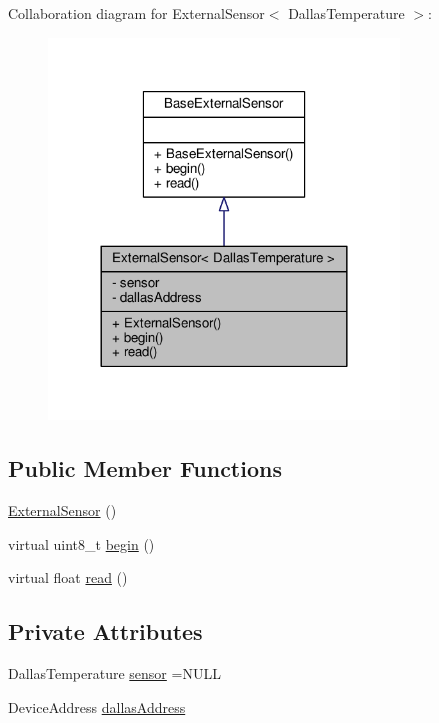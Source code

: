 Collaboration diagram for External\+Sensor$<$ Dallas\+Temperature $>$\+:\nopagebreak
\begin{figure}[H]
\begin{center}
\leavevmode
\includegraphics[width=264pt]{classExternalSensor_3_01DallasTemperature_01_4__coll__graph}
\end{center}
\end{figure}
\subsection*{Public Member Functions}
\begin{DoxyCompactItemize}
\item 
\hyperlink{classExternalSensor_3_01DallasTemperature_01_4_ad290681e8780cdf1870416eee99d699d}{External\+Sensor} ()
\item 
virtual uint8\+\_\+t \hyperlink{classExternalSensor_3_01DallasTemperature_01_4_ac5275129b05e2ff8df45d5b222a661d9}{begin} ()
\item 
virtual float \hyperlink{classExternalSensor_3_01DallasTemperature_01_4_a1e725d9338314515d4e5dc456ed6a6c8}{read} ()
\end{DoxyCompactItemize}
\subsection*{Private Attributes}
\begin{DoxyCompactItemize}
\item 
Dallas\+Temperature \hyperlink{classExternalSensor_3_01DallasTemperature_01_4_adb6ba4fcdedef95ad8f6b0c9b6c0f9d1}{sensor} =N\+U\+LL
\item 
Device\+Address \hyperlink{classExternalSensor_3_01DallasTemperature_01_4_a7d9e9d2893e453638fcf440e5d8d9082}{dallas\+Address}
\end{DoxyCompactItemize}


